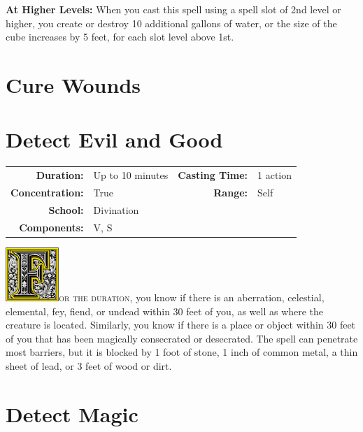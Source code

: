 \documentclass[12pt,showtrims]{memoir}
\begin{document}
\vspace{8pt} \noindent\textbf{At Higher Levels:} When you cast this spell using a spell slot of 2nd level or higher, you create or destroy 10 additional gallons of water, or the size of the cube increases by 5 feet, for each slot level above 1st.
\newpage
{}
\newpage
\section*{Cure Wounds}
\newpage
\section*{Detect Evil and Good}

{
\small\centering\vspace{-6pt}
\begin{tabular}{rlrl}
\toprule

\textbf{Duration:} & Up to 10 minutes &
\textbf{Casting Time:} & 1 action \\
\textbf{Concentration:} & True &
\textbf{Range:} & Self \\
\textbf{School:} & Divination \\
\textbf{Components:} & \multicolumn{3}{p{0.7\textwidth}}{V, S}\\

\bottomrule
\end{tabular}
}

\vspace{1\baselineskip}\noindent
\lettrine[lines=4]{\includegraphics[height=58pt]{initials/F.png}}{or the duration}, you know if there is an aberration, celestial, elemental, fey, fiend, or undead within 30 feet of you, as well as where the creature is located. Similarly, you know if there is a place or object within 30 feet of you that has been magically consecrated or desecrated. The spell can penetrate most barriers, but it is blocked by 1 foot of stone, 1 inch of common metal, a thin sheet of lead, or 3 feet of wood or dirt.

\newpage
\section*{Detect Magic}
\newpage
\end{document}
